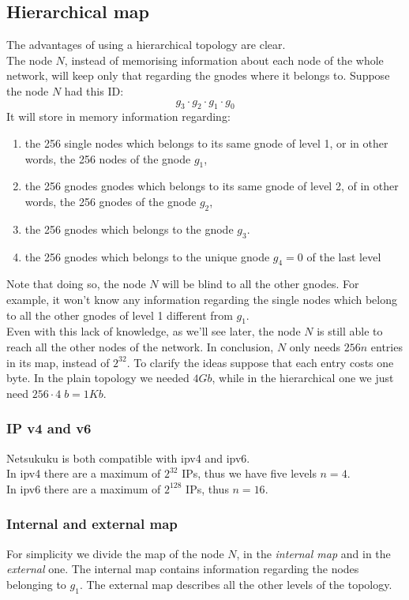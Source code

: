 \documentclass[a4paper]{article}
\begin{document}
\subsection{Hierarchical map}
The advantages of using a hierarchical topology are clear.\\
The node $N$, instead of memorising information about each node of the whole
network, will keep only that regarding the gnodes where it belongs to.
Suppose the node $N$ had this ID:
\[
g_3\cdot g_2\cdot g_1\cdot g_0
\]
It will store in memory information regarding:
\begin{enumerate}
	\item the 256 single nodes which belongs to its same gnode of level 1,
		or in other words, the 256 nodes of the gnode $g_1$,
	\item the 256 gnodes gnodes which belongs to its same gnode of level
		2, of in other words, the 256 gnodes of the gnode $g_2$,
	\item the 256 gnodes which belongs to the gnode $g_3$.
	\item the 256 gnodes which belongs to the unique gnode $g_4=0$ of the
		last level
\end{enumerate}
Note that doing so, the node $N$ will be blind to all the other gnodes. For
example, it won't know any information regarding the single nodes which belong
to all the other gnodes of level 1 different from $g_1$.\\

Even with this lack of knowledge, as we'll see later, the node $N$ is still
able to reach all the other nodes of the network.
In conclusion, $N$ only needs $256n$ entries in its map, instead of $2^{32}$. 
To clarify the ideas suppose that each entry costs one byte. In the plain
topology we needed $4Gb$, while in the hierarchical one we just need $256\cdot 4\;
b= 1Kb$.

\subsubsection{IP v4 and v6}
Netsukuku is both compatible with ipv4 and ipv6.\\

In ipv4 there are a maximum of $2^{32}$ IPs, thus we have five levels $n=4$.\\
In ipv6 there are a maximum of $2^{128}$ IPs, thus $n=16$.

\subsubsection{Internal and external map}
For simplicity we divide the map of the node $N$, in the \emph{internal map} and in
the \emph{external} one.  The internal map contains information regarding the
nodes belonging to $g_1$. The external map describes all the other levels of
the topology.
\end{document}
